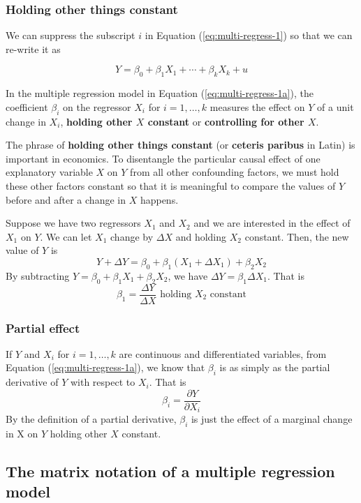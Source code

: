 \documentclass[a4paper,11pt]{article}
\begin{document}
\subsubsection*{Holding other things constant}
\label{sec:orgde7ed4b}
We can suppress the subscript \(i\) in Equation (\ref{eq:multi-regress-1})
so that we can re-write it as

\begin{equation}
\label{eq:multi-regress-1a}
Y = \beta_0 + \beta_1 X_1 + \cdots + \beta_k X_k + u
\end{equation}

In the multiple regression model in Equation
(\ref{eq:multi-regress-1a}), the coefficient \(\beta_i\) on the regressor
\(X_i\) for \(i=1, \ldots, k\) measures the effect on \(Y\) of a unit change
in \(X_i\), \textbf{holding other \(X\) constant} or \textbf{controlling for other
\(X\)}.

The phrase of \textbf{holding other things constant} (or \textbf{ceteris paribus} in
Latin) is important in economics. To disentangle the particular causal
effect of one explanatory variable \(X\) on \(Y\) from all other
confounding factors, we must hold these other factors constant so that
it is meaningful to compare the values of \(Y\) before and after a
change in \(X\) happens.

Suppose we have two regressors \(X_1\) and \(X_2\) and we are interested
in the effect of \(X_1\) on \(Y\). We can let \(X_1\) change by \(\Delta X\)
and holding \(X_2\) constant. Then, the new value of \(Y\) is
\[ Y + \Delta Y = \beta_0 + \beta_1 (X_1 + \Delta X_1) + \beta_2 X_2  \]
By subtracting \(Y = \beta_0 + \beta_1 X_1 + \beta_2 X_2\), we have
\(\Delta Y = \beta_1 \Delta X_1\). That is
\[ \beta_1 = \frac{\Delta Y}{\Delta X} \text{ holding } X_2 \text{ constant} \]

\subsubsection*{Partial effect}
\label{sec:orge9349cc}
If \(Y\) and \(X_i\) for \(i = 1, \ldots, k\) are continuous and
differentiated variables, from Equation (\ref{eq:multi-regress-1a}),
we know that \(\beta_i\) is as simply as the partial derivative of \(Y\) with
respect to \(X_i\). That is \[\beta_i = \frac{\partial Y}{\partial
X_i}\] By the definition of a partial derivative, \(\beta_i\) is just
the effect of a marginal change in X on \(Y\) holding other \(X\)
constant.

\subsection{The matrix notation of a multiple regression model}
\label{sec:org9237f5d}
\end{document}
